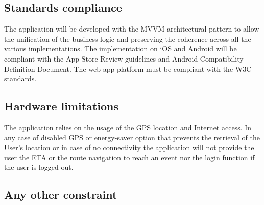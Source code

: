 \subsection{Standards compliance}
The application will be developed with the MVVM architectural pattern to allow the unification of the business logic and preserving the coherence across all the various implementations.
The implementation on iOS and Android will be compliant with the App Store Review guidelines and Android Compatibility Definition Document.
The web-app platform must be compliant with the W3C standards.

\subsection{Hardware limitations}
The application relies on the usage of the GPS location and Internet access. In any case of disabled GPS or energy-saver option that prevents the retrieval of the User’s location or in case of no connectivity the application will not provide the user the ETA or the route navigation to reach an event nor the login function if the user is logged out.

\subsection{Any other constraint}